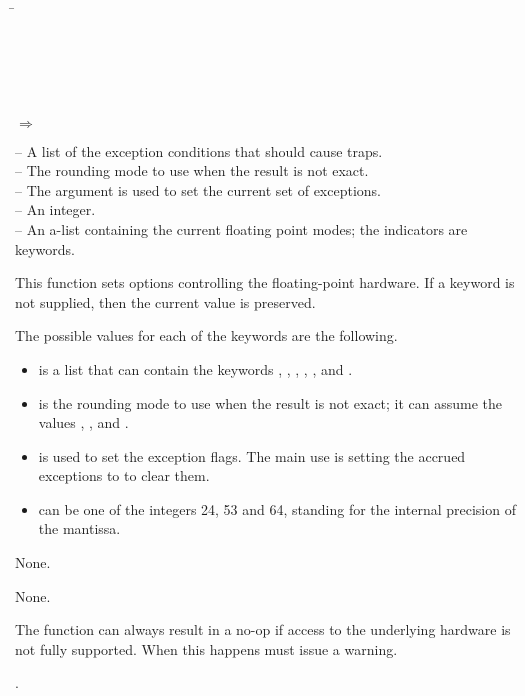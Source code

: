 \documentclass[../Floating-Point-Environment.tex]{subfiles}
\begin{document}

\DSyntax{}

\begin{tabbing}
 \= \\
\>\\
\>\\
\>\\
\>\\
\>\\
$\Rightarrow$ 
\end{tabbing}


\DArgsNValues{}

 -- A list of the exception conditions that should cause
traps.\\
 -- The rounding mode to use when the result is
not exact.\\
 -- The argument is used to set the current
set of exceptions.\\
 -- An integer.\\
 -- An a-list containing the current floating
point modes; the indicators are keywords.

\DDescription{}

This function sets options controlling the floating-point
hardware. If a keyword is not supplied, then the current value is
preserved.

The possible values for each of the keywords are the
following.

\begin{itemize}
\item {} is a list that can contain the keywords
  , , , ,
  , and .

\item {} is the rounding mode to use when the result is
  not exact; it can assume the values ,
  ,  and
  .

\item {} is used to set the exception flags. The
  main use is setting the accrued exceptions to  to clear
  them.

\item {} can be one of the integers 24, 53 and 64, standing for
  the internal precision of the mantissa.
\end{itemize}

\DExamples{}

None.


\DNotes{}

None.


\DExceptional{}

The function can always result in a no-op if access to the underlying
hardware is not fully supported.  When this happens
 must issue a warning.


\DSeeAlso{}

.
\end{document}
